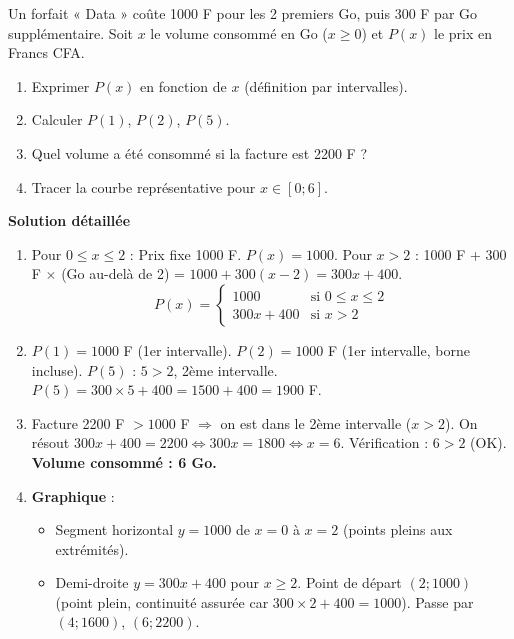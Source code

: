 \documentclass[11pt]{article}
\begin{document}
\begin{exoresolu}
    Un forfait « Data » coûte 1000 F pour les 2 premiers Go, puis 300 F par Go supplémentaire.
    Soit $x$ le volume consommé en Go ($x \ge 0$) et $P(x)$ le prix en Francs CFA.
    \begin{enumerate}
        \item Exprimer $P(x)$ en fonction de $x$ (définition par intervalles).
        \item Calculer $P(1)$, $P(2)$, $P(5)$.
        \item Quel volume a été consommé si la facture est 2200 F ?
        \item Tracer la courbe représentative pour $x \in [0; 6]$.
    \end{enumerate}
    \tcblower
    \textbf{Solution détaillée}
    \begin{enumerate}
        \item Pour $0 \le x \le 2$ : Prix fixe 1000 F. $P(x) = 1000$.
        Pour $x > 2$ : 1000 F + 300 F $\times$ (Go au-delà de 2) = $1000 + 300(x-2) = 300x + 400$.
        \[
        P(x) = \begin{cases}
        1000 & \text{si } 0 \le x \le 2 \\
        300x + 400 & \text{si } x > 2
        \end{cases}
        \]
        \item $P(1) = 1000$ F (1er intervalle). $P(2) = 1000$ F (1er intervalle, borne incluse).
        $P(5)$ : $5 > 2$, 2ème intervalle. $P(5) = 300 \times 5 + 400 = 1500 + 400 = 1900$ F.
        \item Facture 2200 F $> 1000$ F $\Rightarrow$ on est dans le 2ème intervalle ($x > 2$).
        On résout $300x + 400 = 2200 \Leftrightarrow 300x = 1800 \Leftrightarrow x = 6$.
        Vérification : $6 > 2$ (OK). \textbf{Volume consommé : 6 Go.}
        \item \textbf{Graphique} :
        \begin{itemize}
            \item Segment horizontal $y=1000$ de $x=0$ à $x=2$ (points pleins aux extrémités).
            \item Demi-droite $y=300x+400$ pour $x \ge 2$. Point de départ $(2; 1000)$ (point plein, continuité assurée car $300\times2+400=1000$). Passe par $(4; 1600)$, $(6; 2200)$.
        \end{itemize}
    \end{enumerate}
\end{exoresolu}
\end{document}
